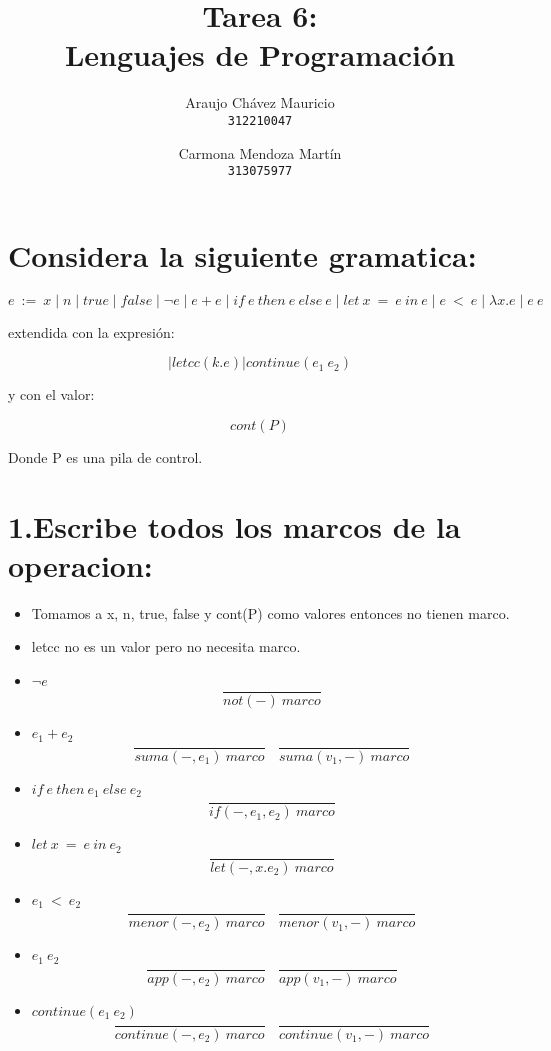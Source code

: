 \documentclass[11pt, a4paper]{report}
\begin{document}
\title{Tarea 6: \\Lenguajes de Programaci\'on}
\author{
  Araujo Chávez Mauricio\\
  \texttt{312210047}
  \and
  Carmona Mendoza Mart\'in\\
  \texttt{313075977}
}
\date{}
\maketitle

\section*{Considera la siguiente gramatica:}
$$ e\ :=\ x\mid n\mid true\mid false\mid \neg e\mid e+e\mid if\ e\ then\ e\ else\ e\mid let\ x\ =\ e\ in\ e\mid e\ <\ e\mid \lambda x.e\mid e\ e $$ 

extendida con la expresi\'on: 

$$|letcc(k.e)|continue(e_{1}\ e_{2})$$ 

y con el valor: 

$$cont(P)$$ 

Donde P es una pila de control.
	
\section*{1.Escribe todos los marcos de la operacion:}

	\begin{itemize}
		\item Tomamos a x, n, true, false y cont(P) como valores entonces  no tienen marco.
		\item letcc no es un valor pero no necesita marco.
		\item $\neg e$
			$$ \frac{}{not(-)\ marco} $$
		\item $e_{1}+e_{2}$
			$$ \frac{}{suma(-,e_{1})\ marco}\ \ \ \ \frac{}{suma(v_{1},-)\ marco} $$
		\item $if\ e\ then\ e_{1}\ else\ e_{2}$
			$$ \frac{}{if(-,e_{1},e_{2})\ marco} $$
		\item $let\ x\ =\ e\ in\ e_{2}$
			$$ \frac{}{let(-,x.e_{2})\ marco} $$
		\item $ e_{1}\ <\ e_{2} $
			$$ \frac{}{menor(-,e_{2})\ marco}\ \ \ \ \frac{}{menor(v_{1},-)\ marco} $$
		\item $e_{1}\ e_{2}$
			$$ \frac{}{app(-,e_{2})\ marco}\ \ \ \ \frac{}{app(v_{1},-)\ marco} $$
		\item $continue(e_{1}\ e_{2})$		
			$$ \frac{}{continue(-,e_{2})\ marco}\ \ \ \ \frac{}{continue(v_{1},-)\ marco} $$
	\end{itemize}
\end{document}
